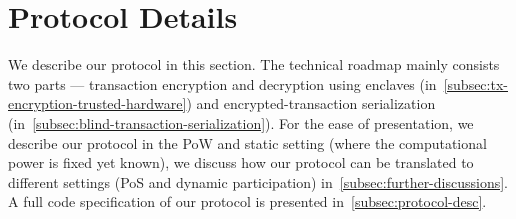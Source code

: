 \section{Protocol Details}
\label{sec:protocol-details}

We describe our protocol \protocFairLedger in this section.
%
The technical roadmap mainly consists two parts --- transaction encryption and decryption using enclaves (in~\cref{subsec:tx-encryption-trusted-hardware}) and encrypted-transaction serialization (in~\cref{subsec:blind-transaction-serialization}).
%
For the ease of presentation, we describe our protocol in the PoW and static setting (where the computational power is fixed yet known), we discuss how our protocol can be translated to different settings (PoS and dynamic participation) in~\cref{subsec:further-discussions}.
%
A full code specification of our protocol is presented in~\cref{subsec:protocol-desc}.





